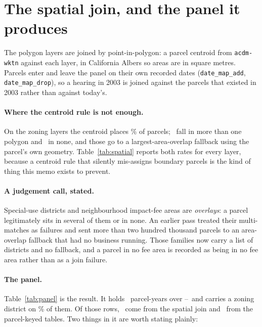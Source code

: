 \documentclass[11pt]{article}
\begin{document}
\section{The spatial join, and the panel it produces}
\label{sec:panel}

The polygon layers are joined by point-in-polygon: a parcel centroid from \texttt{acdm-wktn}
against each layer, in California Albers so areas are in square metres. Parcels enter and
leave the panel on their own recorded dates (\texttt{date\_map\_add}, \texttt{date\_map\_drop}),
so a hearing in 2003 is joined against the parcels that existed in 2003 rather than against
today's.

\paragraph{Where the centroid rule is not enough.} On the zoning layers the centroid places
\acqCentroidRate\% of parcels; \acqCentroidMulti\ fall in more than one polygon and
\acqCentroidUnmatched\ in none, and those go to a largest-area-overlap fallback using the
parcel's own geometry. Table~\ref{tab:spatial} reports both rates for every layer, because a
centroid rule that silently mis-assigns boundary parcels is the kind of thing this memo exists
to prevent.

\paragraph{A judgement call, stated.} Special-use districts and neighbourhood impact-fee areas
are \emph{overlays}: a parcel legitimately sits in several of them or in none. An earlier pass
treated their multi-matches as failures and sent more than two hundred thousand parcels to an
area-overlap fallback that had no business running. Those families now carry a list of
districts and no fallback, and a parcel in no fee area is recorded as being in no fee area
rather than as a join failure.

\paragraph{The panel.} Table~\ref{tab:panel} is the result. It holds \acqPanelRows\
parcel-years over \acqPanelFirst--\acqPanelLast\ and carries a zoning district on
\acqPanelZoned\% of them. Of those rows, \acqPanelBySpatial\ come from the spatial join and
\acqPanelByTable\ from the parcel-keyed tables. Two things in it are worth stating plainly:
\end{document}
